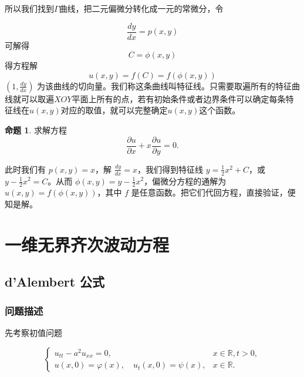 \documentclass[12pt,a4paper]{article}
\numberwithin{subsection}{section}   %
\numberwithin{subsubsection}{subsection}
\theoremstyle{plain}
\theoremstyle{definition}
\newtheorem{example}{命题}[subsection]  %
\theoremstyle{remark}
\theoremstyle{remark}
\begin{document}
	所以我们找到$\Gamma$曲线，把二元偏微分转化成一元的常微分，令
	
	\begin{equation}
		\frac{dy}{dx} = p(x, y)
	\end{equation}
	可解得
	\begin{equation}
		C=\phi(x,y)
	\end{equation}
	得方程解
	\begin{equation}
		u(x, y)=f(C)=f(\phi(x,y))
	\end{equation}
	$(1, \frac{dy}{dx})$
	为该曲线的切向量。我们称这条曲线叫特征线。只需要取遍所有的特征曲线就可以取遍$XOY$平面上所有的点，若有初始条件或者边界条件可以确定每条特征线在$u(x, y)$对应的取值，就可以完整确定$u(x, y)$这个函数。
	
	\begin{example}求解方程
		\begin{equation}
			\frac{\partial u}{\partial x} + x \frac{\partial u}{\partial y} = 0.
		\end{equation}
		
		此时我们有 $p(x, y) = x$，解 $\frac{dy}{dx} = x$，我们得到特征线 $y = \frac{1}{2}x^2 + C$，或 $y - \frac{1}{2}x^2 = C$。从而 $\phi(x, y) = y - \frac{1}{2}x^2$，偏微分方程的通解为 $u(x, y) = f(\phi(x, y))$，其中 $f$ 是任意函数。把它们代回方程，直接验证，便知是解。
	\end{example}
	
	\newpage
	
	\section{一维无界齐次波动方程}
	
	\subsection{d’Alembert 公式}
	
	\subsubsection{问题描述}
	先考察初值问题
	
	\begin{equation}
		\begin{cases}
			u_{tt} - a^2 u_{xx} = 0, & x \in \mathbb{R}, t > 0, \\
			u(x, 0) = \varphi(x), \quad u_t(x, 0) = \psi(x), & x \in \mathbb{R}.
		\end{cases}
	\end{equation}
	
\end{document}

